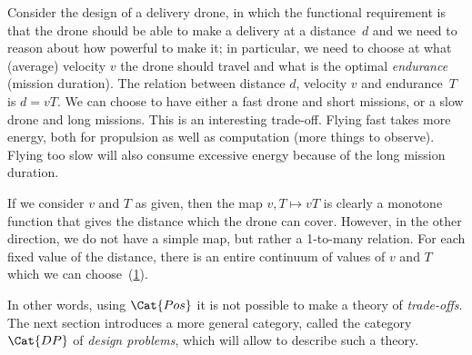 \begin{example}
Consider the design of a delivery drone, in which the functional
requirement is that the drone should be able to make a delivery
at a distance~$d$ and we need to reason about how powerful to make
it; in particular, we need to choose at what (average) velocity $v$ the drone  should travel and what is the optimal \emph{endurance} (mission duration). The relation between distance $d$, velocity $v$ and endurance~$T$ is $d=vT$. We can choose
to have either a fast drone and short missions, or a slow drone
and long missions. This is an interesting trade-off. Flying fast takes more energy, both for propulsion as well as computation (more things to observe). Flying too slow will also consume excessive energy because of the long mission duration.

If we consider $v$ and $T$ as given, then the map $v,T \mapsto vT$ is clearly a monotone function that gives the distance which the drone can cover. However, in the other direction, we do not have a simple map, but rather a 1-to-many relation. For each fixed value of the distance, there is an entire continuum of values of $v$ and $T$ which we can choose~(\cref{fig:drone-example-antichain}).

\begin{figure}[h!]
    \centering
    \caption{\label{fig:drone-example}
    \label{fig:drone-example-antichain}}
\end{figure}

\end{example}

In other words, using $\Cat{Pos}$ it is not possible to make a theory of \emph{trade-offs}. The
next section introduces a more general category, called  the category $\Cat{DP}$ of
\emph{design problems}, which will allow to describe such a theory.
